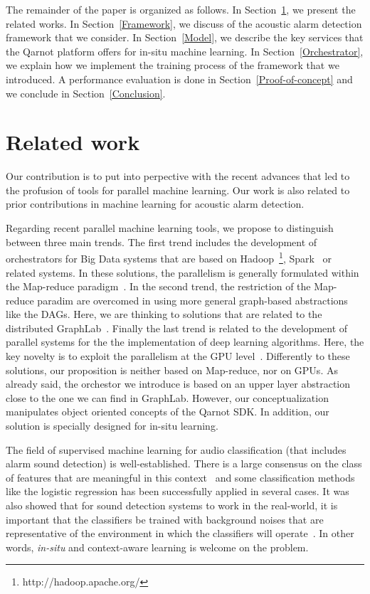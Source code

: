 \documentclass[10pt, conference, compsocconf]{IEEEtran}
\begin{document}
The remainder of the paper is organized as follows. In Section~\ref{Related}, we present the related works. 
In Section~\ref{Framework}, we discuss of the acoustic alarm detection framework that we consider. In Section~\ref{Model}, we describe 
the key services that the Qarnot platform offers for in-situ machine learning. In Section~\ref{Orchestrator}, we explain 
how we implement the training process of the framework that we introduced. A performance evaluation is done in 
Section~\ref{Proof-of-concept} and we conclude in Section~\ref{Conclusion}.

\section{Related work} \label{Related}


Our contribution is to put into perpective with the recent advances that led to the profusion of tools for parallel 
machine learning. Our work is also related to prior contributions in machine learning for acoustic alarm detection. 

Regarding recent parallel machine learning tools, we propose to distinguish between three main trends. 
The first trend includes the development of orchestrators for Big Data systems that are based on Hadoop~\footnote{http://hadoop.apache.org/}, Spark~\cite{Zaharia:2010:SCC:1863103.1863113} or related systems. 
In these solutions, the parallelism is generally formulated within the Map-reduce paradigm~\cite{DBLP:journals/cacm/DeanG10}. 
In the second trend, the restriction of the Map-reduce paradim are overcomed in using more general graph-based abstractions like 
the DAGs. Here, we are thinking to solutions that are related to 
the distributed GraphLab~\cite{Low:2012:DGF:2212351.2212354}.  Finally the last trend is related to the development of parallel 
systems for the the implementation of deep learning algorithms. Here, the key novelty is to exploit the parallelism at the GPU 
level~\cite{Raina:2009:LDU:1553374.1553486}.
Differently to these solutions, our proposition is neither based on Map-reduce, nor on GPUs. As already said, the orchestor we introduce 
is based on an upper layer abstraction close to the one we can find in GraphLab. However, our conceptualization manipulates object 
oriented concepts of the Qarnot SDK. In addition, our solution is specially designed for in-situ learning. 


The field of supervised machine learning for audio classification (that includes alarm sound detection) is well-established. There is a 
large consensus on the class of features that are meaningful in this context~\cite{Mckinney03featuresfor,DBLP:journals/taslp/JoderER09} 
and some classification 
methods like the logistic regression has been successfully applied in several cases. It was also showed 
that for sound detection systems to work in the real-world, it is important that the classifiers be trained with 
background noises that are representative of the environment in which the classifiers will operate~\cite{DBLP:conf/icassp/SalamonB15}. 
In other words, {\it in-situ} and context-aware learning is welcome on the problem. 
\end{document}
